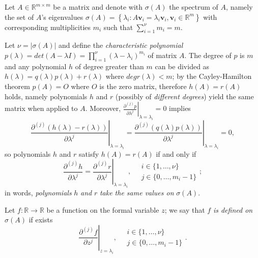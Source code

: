 
Let $A\in\mathbb{R}^{m\times m}$ be a matrix and denote with $\sigma(A)$ the
spectrum of $A$, namely the set of $A$'s eigenvalues
$\sigma(A) = \left\lbrace \lambda_{i}:
A\boldsymbol{v}_{i}=\lambda_{i}\boldsymbol{v}_{i},
\boldsymbol{v}_{i}\in\mathbb{R}^{m}\right\rbrace$
with corresponding multiplicities $m_{i}$ such that $ \sum_{i=1}^{\nu}{m_{i}}=m$.

Let $\nu=\left|\sigma(A)\right|$ and define the \textit{characteristic
polynomial} $p(\lambda)=det{\left(A-\lambda
I\right)}=\prod_{i=1}^{\nu}{(\lambda - \lambda_{i})^{m_{i}}}$ of matrix $A$.
The degree of $p$ is $m$ and any polynomial $h$ of degree greater than $m$ can
be divided as $h(\lambda) = q(\lambda)p(\lambda)+r(\lambda)$ where
$deg{r(\lambda) < m}$; by the Cayley-Hamilton theorem $p(A)=O$ where $O$ is the
zero matrix, therefore $h(A) = r(A)$ holds, namely polynomials $h$ and $r$
(possibly of \textit{different degrees}) yield the same matrix when applied to
$A$.  Moreover, $\displaystyle \left.
\frac{\partial^{(j)}{p}}{\partial{\lambda}^{j}} \right|_{\lambda=\lambda_{i}}=0
$ implies
\begin{displaymath}
\left.\frac{\partial^{(j)}\left(h(\lambda) - r(\lambda)\right)}{\partial\lambda^{j}}\right|_{\lambda=\lambda_{i}} =
\left.\frac{\partial^{(j)}\left(q(\lambda)p(\lambda)\right)}{\partial\lambda^{j}}\right|_{\lambda=\lambda_{i}} = 0,
\end{displaymath}
so polynomials $h$ and $r$ satisfy $h(A)=r(A)$ if and only if
\begin{displaymath}
\left.\frac{\partial^{(j)}h}{\partial\lambda^{j}}=\frac{\partial^{(j)}r}{\partial\lambda^{j}}\right|_{\lambda=\lambda_{i}},
\quad 
\begin{array}{l} 
    i\in \lbrace 1, \ldots, \nu \rbrace \\
    j \in \lbrace 0, \ldots, m_{i}-1 \rbrace
\end{array};
\end{displaymath}
in words, \textit{polynomials} $h$ \textit{and} $r$ \textit{take the same values on} $\sigma(A)$.

Let $f:\mathbb{R}\rightarrow \mathbb{R}$ be a function on the formal variable
$z$; we say that $f$ \textit{is defined on $\sigma(A)$} if exists
\begin{displaymath}
    \left. \frac{\partial^{(j)}{f}}{\partial{z}^{j}} \right|_{z=\lambda_{i}},
    \quad 
    \begin{array}{l} 
        i\in \lbrace 1, \ldots, \nu \rbrace \\
        j \in \lbrace 0, \ldots, m_{i}-1 \rbrace
    \end{array}.
\end{displaymath}

